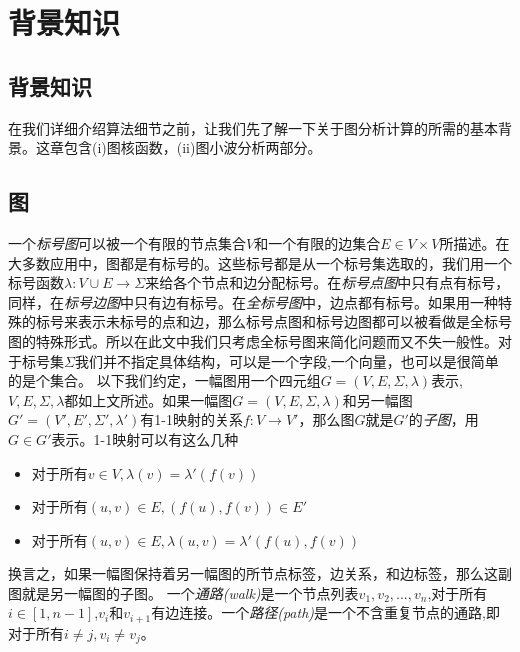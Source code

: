 \documentclass{article}
\begin{document}
\section{背景知识}
\else
\subsection{背景知识}
\fi
在我们详细介绍算法细节之前，让我们先了解一下关于图分析计算的所需的基本背景。这章包含(i)图核函数，(ii)图小波分析两部分。
\subsection{图}
一个\emph{标号图}可以被一个有限的节点集合$V$和一个有限的边集合$E\in V\times V$所描述。在大多数应用中，图都是有标号的。这些标号都是从一个标号集选取的，我们用一个标号函数$\lambda :V\cup E\rightarrow \Sigma$来给各个节点和边分配标号。在\emph{标号点图}中只有点有标号，同样，在\emph{标号边图}中只有边有标号。在\emph{全标号图}中，边点都有标号。如果用一种特殊的标号来表示未标号的点和边，那么标号点图和标号边图都可以被看做是全标号图的特殊形式。所以在此文中我们只考虑全标号图来简化问题而又不失一般性。对于标号集$\Sigma$我们并不指定具体结构，可以是一个字段,一个向量，也可以是很简单的是个集合。
以下我们约定，一幅图用一个四元组$G=(V,E,\Sigma ,\lambda )$表示,$V,E,\Sigma,\lambda$都如上文所述。如果一幅图$G=(V,E,\Sigma,\lambda)$和另一幅图$G'=(V',E',\Sigma',\lambda')$有1-1映射的关系$f:V\rightarrow V'$，那么图$G$就是$G'$的\emph{子图}，用$G\in G' $表示。1-1映射可以有这么几种
\begin{itemize}
    \item 对于所有$v\in V,\lambda(v)=\lambda '(f(v))$
    \item 对于所有$(u,v)\in E,(f(u),f(v))\in E'$
    \item 对于所有$(u,v)\in E,\lambda(u,v)=\lambda '(f(u),f(v)) $
\end{itemize}
换言之，如果一幅图保持着另一幅图的所节点标签，边关系，和边标签，那么这副图就是另一幅图的子图。
一个\emph{通路(walk)}是一个节点列表$v_1,v_2,...,v_n$,对于所有$i\in [1,n-1]$,$v_i$和$v_{i+1}$有边连接。一个\emph{路径(path)}是一个不含重复节点的通路,即对于所有$i\neq j,v_i \neq v_j$。
\end{document}
